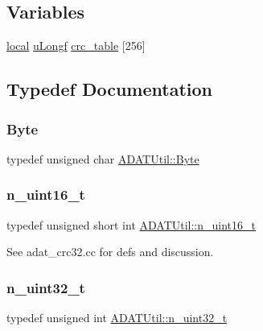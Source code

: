 \subsection*{Variables}
\begin{DoxyCompactItemize}
\item 
\mbox{\hyperlink{adat__devel_2lib_2io_2adat__crc32_8cc_a08023ea6765c99d60a6a3840cd07156e}{local}} \mbox{\hyperlink{namespaceADATUtil_adf7f8db2cc2f19fe6143cf8a2ad881f4}{u\+Longf}} \mbox{\hyperlink{namespaceADATUtil_a3936457e43366b1c492c10870155ef6c}{crc\+\_\+table}} \mbox{[}256\mbox{]}
\end{DoxyCompactItemize}


\subsection{Typedef Documentation}
\mbox{\label{namespaceADATUtil_a420451c5593252de7271d104b24079b5}} 
\subsubsection{\texorpdfstring{Byte}{Byte}}
{\footnotesize\ttfamily typedef unsigned char \mbox{\hyperlink{namespaceADATUtil_a420451c5593252de7271d104b24079b5}{A\+D\+A\+T\+Util\+::\+Byte}}}

\mbox{\label{namespaceADATUtil_a8e184fda37156fed1e06319a0051e987}} 
\subsubsection{\texorpdfstring{n\_uint16\_t}{n\_uint16\_t}}
{\footnotesize\ttfamily typedef unsigned short int \mbox{\hyperlink{namespaceADATUtil_a8e184fda37156fed1e06319a0051e987}{A\+D\+A\+T\+Util\+::n\+\_\+uint16\+\_\+t}}}



See adat\+\_\+crc32.\+cc for defs and discussion. 

\mbox{\label{namespaceADATUtil_ad945a8afa4db2d1f89b731964adae97e}} 
\subsubsection{\texorpdfstring{n\_uint32\_t}{n\_uint32\_t}}
{\footnotesize\ttfamily typedef unsigned int \mbox{\hyperlink{namespaceADATUtil_ad945a8afa4db2d1f89b731964adae97e}{A\+D\+A\+T\+Util\+::n\+\_\+uint32\+\_\+t}}}

